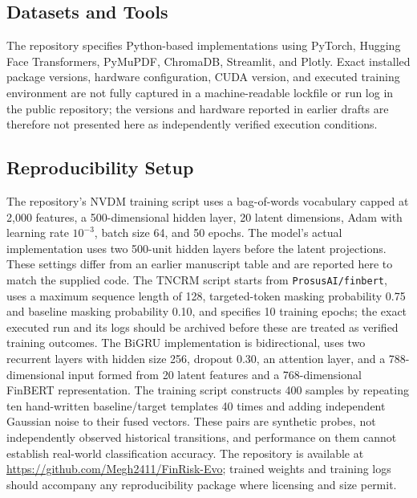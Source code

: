 \documentclass[pdflatex,sn-basic,Numbered]{sn-jnl}
\begin{document}
\subsection{Datasets and Tools}
The repository specifies Python-based implementations using PyTorch, Hugging Face Transformers, PyMuPDF, ChromaDB, Streamlit, and Plotly. Exact installed package versions, hardware configuration, CUDA version, and executed training environment are not fully captured in a machine-readable lockfile or run log in the public repository; the versions and hardware reported in earlier drafts are therefore not presented here as independently verified execution conditions.

\subsection{Reproducibility Setup}
The repository's NVDM training script uses a bag-of-words vocabulary capped at 2,000 features, a 500-dimensional hidden layer, 20 latent dimensions, Adam with learning rate $10^{-3}$, batch size 64, and 50 epochs. The model's actual implementation uses two 500-unit hidden layers before the latent projections. These settings differ from an earlier manuscript table and are reported here to match the supplied code. The TNCRM script starts from \texttt{ProsusAI/finbert}, uses a maximum sequence length of 128, targeted-token masking probability 0.75 and baseline masking probability 0.10, and specifies 10 training epochs; the exact executed run and its logs should be archived before these are treated as verified training outcomes. The BiGRU implementation is bidirectional, uses two recurrent layers with hidden size 256, dropout 0.30, an attention layer, and a 788-dimensional input formed from 20 latent features and a 768-dimensional FinBERT representation. The training script constructs 400 samples by repeating ten hand-written baseline/target templates 40 times and adding independent Gaussian noise to their fused vectors. These pairs are synthetic probes, not independently observed historical transitions, and performance on them cannot establish real-world classification accuracy. The repository is available at \url{https://github.com/Megh2411/FinRisk-Evo}; trained weights and training logs should accompany any reproducibility package where licensing and size permit.
\end{document}
